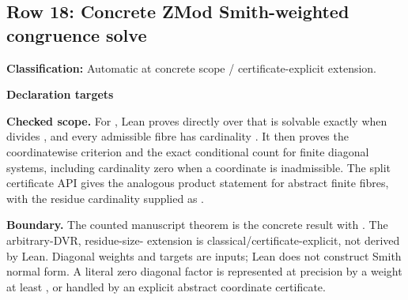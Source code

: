 \subsection{Row 18: Concrete ZMod Smith-weighted congruence solve}
\label{row:18}
\textbf{Classification:} Automatic at concrete scope / certificate-explicit extension.
\par\smallskip\textbf{Declaration targets}\par
{\small\noindent{}\par}
{\small\noindent{}\par}
{\small\noindent{}\par}
{\small\noindent{}\par}
{\small\noindent{}\par}
{\small\noindent{}\par}
{\small\noindent{}\par}
{\small\noindent{}\par}
{\small\noindent{}\par}
{\small\noindent{}\par}
\smallskip\textbf{Checked scope.} For , Lean proves directly over  that  is solvable exactly when  divides , and every admissible fibre has cardinality . It then proves the coordinatewise criterion and the exact conditional count  for finite diagonal systems, including cardinality zero when a coordinate is inadmissible. The split certificate API gives the analogous product statement for abstract finite fibres, with the residue cardinality supplied as .
\par\smallskip\textbf{Boundary.} The counted manuscript theorem is the concrete  result with . The arbitrary-DVR, residue-size- extension is classical/certificate-explicit, not derived by Lean. Diagonal weights and targets are inputs; Lean does not construct Smith normal form. A literal zero diagonal factor is represented at precision  by a weight at least , or handled by an explicit abstract coordinate certificate.
\medskip
{}
